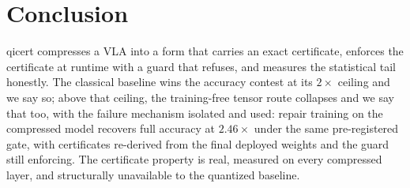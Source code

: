 \documentclass[conference,10pt]{IEEEtran}
\begin{document}
\section{Conclusion}

qicert compresses a VLA into a form that carries an exact certificate,
enforces the certificate at runtime with a guard that refuses, and measures
the statistical tail honestly. The classical baseline wins the accuracy
contest at its $2\times$ ceiling and we say so; above that ceiling, the
training-free tensor route collapses and we say that too, with the
failure mechanism isolated and used: repair training on the compressed
model recovers full accuracy at $2.46\times$ under the same pre-registered
gate, with certificates re-derived from the final deployed weights and the
guard still enforcing. The certificate property is real, measured on every
compressed layer, and structurally unavailable to the quantized baseline.
\end{document}
